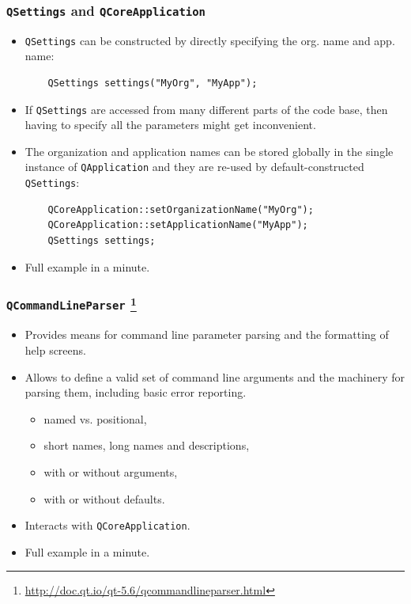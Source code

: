\begin{frame}[fragile]
  \frametitle{\texttt{QSettings} and \texttt{QCoreApplication}}
  \small
  \begin{itemize}
    \item \texttt{QSettings} can be constructed by directly specifying the
      org. name and app. name:
      \begin{verbatim}
	QSettings settings("MyOrg", "MyApp");
      \end{verbatim}
    \item If \texttt{QSettings} are accessed from many different parts of the
      code base, then having to specify all the parameters might get inconvenient.
    \item The organization and application names can be stored globally in the
      single instance of \texttt{QApplication} and they are re-used by
      default-constructed \texttt{QSettings}:
      \begin{verbatim}
	QCoreApplication::setOrganizationName("MyOrg");
	QCoreApplication::setApplicationName("MyApp");
	QSettings settings;
      \end{verbatim}
    \item Full example in a minute.
  \end{itemize}
\end{frame}

\begin{frame}[fragile]
  \frametitle{\texttt{QCommandLineParser}
    \footnote{\url{http://doc.qt.io/qt-5.6/qcommandlineparser.html}}}
  \begin{itemize}
    \item Provides means for command line parameter parsing
      and the formatting of help screens.
    \item Allows to define a valid set of command line arguments and
      the machinery for parsing them, including basic error reporting.
      \begin{itemize}
        \item named vs. positional,
        \item short names, long names and descriptions,
        \item with or without arguments,
        \item with or without defaults.
      \end{itemize}
    \item Interacts with \texttt{QCoreApplication}.
    \item Full example in a minute.
  \end{itemize}
\end{frame}

